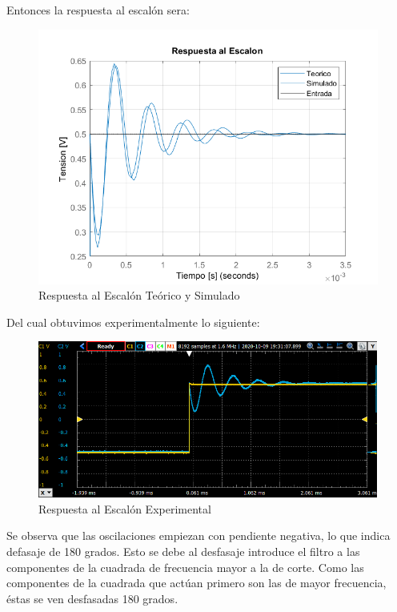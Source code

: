 Entonces la respuesta al escalón sera:

\begin{figure}[H]
    \centering
    \includegraphics[scale = 0.8]{../Ejercicio1-FiltroConGIC/Informe/re.png}
    \caption{Respuesta al Escalón Teórico y Simulado}
    \label{ej1reteo}
\end{figure}

Del cual obtuvimos experimentalmente lo siguiente:

\begin{figure}[H]
    \centering
    \includegraphics[scale = 0.8]{../Ejercicio1-FiltroConGIC/Informe/re1.png}
    \caption{Respuesta al Escalón Experimental}
    \label{ej1reexp}
\end{figure}

Se observa que las oscilaciones empiezan con pendiente negativa, lo que indica defasaje de 180 grados. Esto se debe al desfasaje introduce el filtro a las componentes de la cuadrada de frecuencia mayor a la de corte. Como las componentes de la cuadrada que actúan primero son las de mayor frecuencia, éstas se ven desfasadas 180 grados. 

